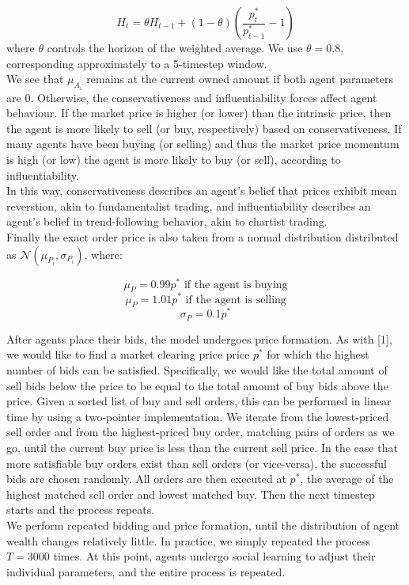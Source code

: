\documentclass[11pt]{article}
\begin{document}
\begin{equation}
H_t = \theta H_{t-1} + (1 - \theta)(\frac{p^*_t}{p^*_{t-1}} - 1)
\end{equation}
where $\theta$ controls the horizon of the weighted average. We use $\theta=0.8$, corresponding approximately to a 5-timestep window. \\
We see that $\mu_{A_i}$ remains at the current owned amount if both agent parameters are $0$. Otherwise, the conservativeness and influentiability forces affect agent behaviour. If the market price is higher (or lower) than the intrinsic price, then the agent is more likely to sell (or buy, respectively) based on conservativeness. If many agents have been buying (or selling) and thus the market price momentum is high (or low) the agent is more likely to buy (or sell), according to influentiability.\\
In this way, conservativeness describes an agent's belief that prices exhibit mean reverstion, akin to fundamentalist trading, and influentiability describes an agent's belief in trend-following behavior, akin to chartist trading. \\
Finally the exact order price is also taken from a normal distribution distributed as $\mathcal{N}(\mu_{P_i}, \sigma_{P_i})$, where:

\begin{equation}
\mu_P = 0.99 p^* \text{ if the agent is buying}
\end{equation}
\begin{equation}
\mu_P = 1.01 p^* \text{ if the agent is selling}
\end{equation}
\begin{equation}
\sigma_P = 0.1p^*
\end{equation}

After agents place their bids, the model undergoes price formation. As with [1], we would like to find a market clearing price price $p^*$ for which the highest number of bids can be satisfied. Specifically, we would like the total amount of sell bids below the price to be equal to the total amount of buy bids above the price. Given a sorted list of buy and sell orders, this can be performed in linear time by using a two-pointer implementation. We iterate from the lowest-priced sell order and from the highest-priced buy order, matching pairs of orders as we go, until the current buy price is less than the current sell price. In the case that more satisfiable buy orders exist than sell orders (or vice-versa), the successful bids are chosen randomly. All orders are then executed at $p^*$, the average of the highest matched sell order and lowest matched buy. Then the next timestep starts and the process repeats. \\
We perform repeated bidding and price formation, until the distribution of agent wealth changes relatively little. In practice, we simply repeated the process $T=3000$ times. At this point, agents undergo social learning to adjust their individual parameters, and the entire process is repeated. \\
\end{document}
